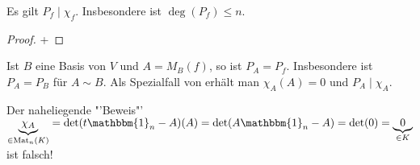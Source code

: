 \begin{conclusion}
	Es gilt $P_f\mid \chi_f$. Insbesondere ist $\deg(P_f)\le n$.
\end{conclusion}
\begin{proof}
	 + 
\end{proof}

\begin{remark}
	Ist $B$ eine Basis von $V$ und $A=M_B(f)$, so ist $P_A=P_f$. Insbesondere ist $P_A=P_B$ für $A\sim B$. Als Spezialfall von  erhält man $\chi_A(A)=0$ und $P_A\mid \chi_A$.
\end{remark}

\begin{remark}
	Der naheliegende "'Beweis"' $\underbrace{\chi_A}_{\in\Mat_n(K)}=\det(t\mathbbm{1}_n-A)(A) =\det(A\mathbbm{1}_n-A)=\det(0)=\underbrace{0}_{\in K}$ ist falsch!
\end{remark}
